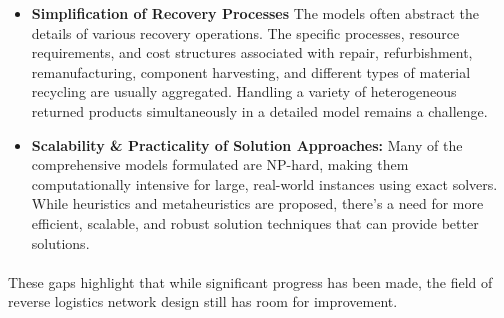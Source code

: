 \begin{itemize}[label=,leftmargin=2mm]
    \item \textbf{Simplification of Recovery Processes}
        The models often abstract the details of various recovery operations. The specific processes, resource requirements, and cost structures associated with repair, refurbishment, remanufacturing, component harvesting, and different types of material recycling are usually aggregated. Handling a variety of heterogeneous returned products simultaneously in a detailed model remains a challenge.

    \item \textbf{Scalability \& Practicality of Solution Approaches:}
        Many of the comprehensive models formulated are NP-hard, making them computationally intensive for large, real-world instances using exact solvers. While heuristics and metaheuristics are proposed, there's a need for more efficient, scalable, and robust solution techniques that can provide better solutions.
\end{itemize}
\paragraph{} These gaps highlight that while significant progress has been made, the field of reverse logistics network design still has room for improvement.